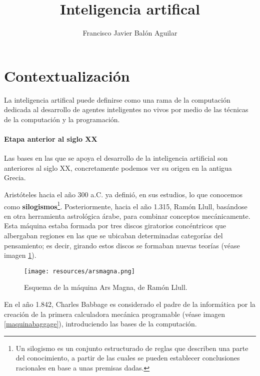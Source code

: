 \documentclass[a4paper, 11pt, titlepage]{article}
\title{Inteligencia artifical}
\author{Francisco Javier Balón Aguilar}
\begin{document}
\maketitle
\renewcommand{\contentsname}{Índice}
\tableofcontents
\listoffigures

\newpage

\section{Contextualización}

    La inteligencia artifical puede definirse como una rama de la computación dedicada al
    desarrollo de agentes inteligentes no vivos por medio de las técnicas de la computación 
    y la programación.

    \paragraph{Etapa anterior al siglo XX} Las bases en las que se apoya el desarrollo de la inteligencia 
    artificial son anteriores al siglo XX, concretamente podemos ver su origen en la antigua Grecia.

    Aristóteles hacia el año 300 a.C. ya definió, en sus estudios, lo que conocemos como 
    \textbf{silogismos}\footnote{
        Un silogismo es un conjunto estructurado de reglas que describen una parte del conocimiento, 
        a partir de las cuales se pueden establecer conclusiones racionales en base a unas 
        premisas dadas.
    }. Posteriormente, hacia el año 1.315, Ramón Llull, basándose en otra herramienta astrológica 
    árabe, para combinar conceptos mecánicamente. Esta máquina estaba formada por tres discos 
    giratorios concéntricos que albergaban regiones en las que se ubicaban determinadas categorías 
    del pensamiento; es decir, girando estos discos se formaban nuevas teorías (véase imagen 
    \ref{arsmagna}).

    \begin{figure}[htp]
        \centering
        \texttt{[image: resources/arsmagna.png]}
        \caption{Esquema de la máquina Ars Magna, de Ramón Llull.}
        \label{arsmagna}
    \end{figure}

    En el año 1.842, Charles Babbage es considerado el padre de la informática por la creación de la 
    primera calculadora mecánica programable (véase imagen \ref{maquinabaggage}), introduciendo las bases 
    de la computación.
\end{document}
